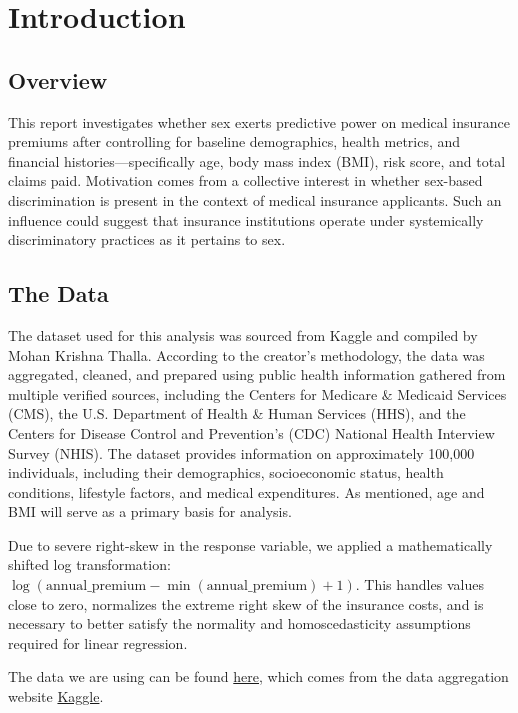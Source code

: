 \documentclass[12pt, a4paper]{article}
\begin{document}
\section{Introduction}
 
\subsection{Overview}
This report investigates whether sex exerts predictive power on medical insurance premiums after controlling for baseline demographics, health metrics, and financial histories—specifically age, body mass index (BMI), risk score, and total claims paid. Motivation comes from a collective interest in whether sex-based discrimination is present in the context of medical insurance applicants. Such an influence could suggest that insurance institutions operate under systemically discriminatory practices as it pertains to sex.
 
\subsection{The Data}
 
The dataset used for this analysis was sourced from Kaggle and compiled by Mohan Krishna Thalla. According to the creator's methodology, the data was aggregated, cleaned, and prepared using public health information gathered from multiple verified sources, including the Centers for Medicare \& Medicaid Services (CMS), the U.S. Department of Health \& Human Services (HHS), and the Centers for Disease Control and Prevention's (CDC) National Health Interview Survey (NHIS). The dataset provides information on approximately 100,000 individuals, including their demographics, socioeconomic status, health conditions, lifestyle factors, and medical expenditures. As mentioned, age and BMI will serve as a primary basis for analysis.
 
Due to severe right-skew in the response variable, we applied a mathematically shifted log transformation: $\log(\text{annual\_premium} - \min(\text{annual\_premium}) + 1)$. This handles values close to zero, normalizes the extreme right skew of the insurance costs, and is necessary to better satisfy the normality and homoscedasticity assumptions required for linear regression.
 
The data we are using can be found \href{https://www.kaggle.com/datasets/mohankrishnathalla/medical-insurance-cost-prediction/data}{here}, which comes from the data aggregation website \href{https://www.kaggle.com}{Kaggle}.
 
\end{document}
